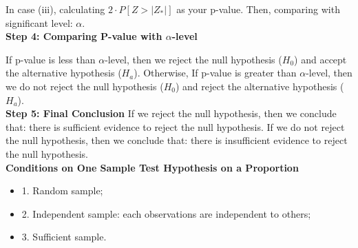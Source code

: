 In case (iii), calculating $2\cdot P[Z > |Z_*|]$ as your p-value. Then, comparing with significant level: $\alpha$.\\

\textbf{Step 4: Comparing P-value with $\alpha$-level}

If p-value is less than $\alpha$-level, then we reject the null hypothesis ($H_0$) and accept the alternative hypothesis ($H_a$). Otherwise, If p-value is greater than $\alpha$-level, then we do not reject the null hypothesis ($H_0$) and reject the alternative hypothesis ($H_a$).\\

\textbf{Step 5: Final Conclusion}
If we reject the null hypothesis, then we conclude that: there is sufficient evidence to reject the null hypothesis. If we do not reject the null hypothesis, then we conclude that: there is insufficient evidence to reject the null hypothesis.\\

\textbf{Conditions on One Sample Test Hypothesis on a Proportion}
\begin{itemize}
	\item 1. Random sample;
	\item 2. Independent sample: each observations are independent to others;
	\item 3. Sufficient sample.
\end{itemize}










